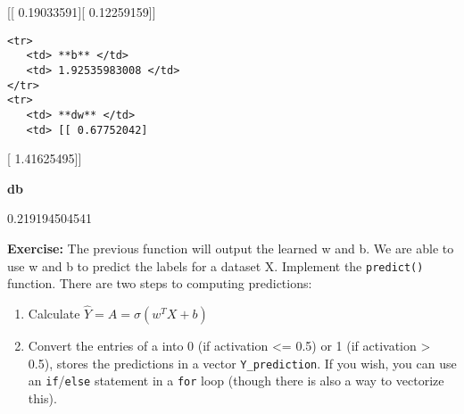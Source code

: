 \documentclass[11pt]{article}
\begin{document}
{[}{[} 0.19033591{]}{[} 0.12259159{]}{]}

\begin{verbatim}
<tr>
   <td> **b** </td>
   <td> 1.92535983008 </td>
</tr>
<tr>
   <td> **dw** </td>
   <td> [[ 0.67752042]
\end{verbatim}

{[} 1.41625495{]}{]}

\textbf{db}

0.219194504541

    \textbf{Exercise:} The previous function will output the learned w and
b. We are able to use w and b to predict the labels for a dataset X.
Implement the \texttt{predict()} function. There are two steps to
computing predictions:

\begin{enumerate}
\def\labelenumi{\arabic{enumi}.}
\item
  Calculate $\hat{Y} = A = \sigma(w^T X + b)$
\item
  Convert the entries of a into 0 (if activation \textless{}= 0.5) or 1
  (if activation \textgreater{} 0.5), stores the predictions in a vector
  \texttt{Y\_prediction}. If you wish, you can use an
  \texttt{if}/\texttt{else} statement in a \texttt{for} loop (though
  there is also a way to vectorize this).
\end{enumerate}
\end{document}
